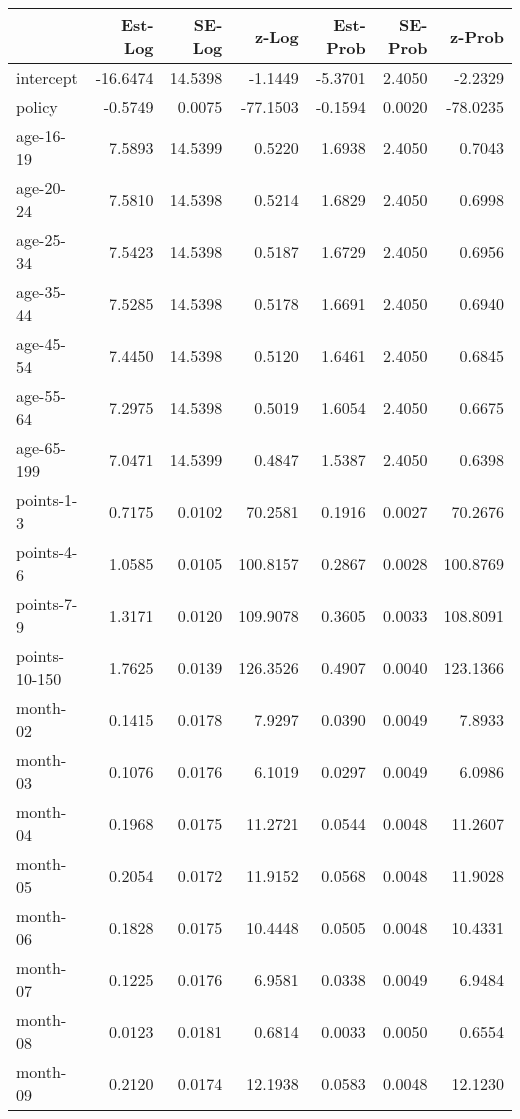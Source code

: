 \documentclass[10pt]{article}
\begin{document}
\begin{table}[ht]
\centering
\begin{tabular}{lrrrrrr}
  \hline
 & Est-Log & SE-Log & z-Log & Est-Prob & SE-Prob & z-Prob \\ 
  \hline
intercept & -16.6474 & 14.5398 & -1.1449 & -5.3701 & 2.4050 & -2.2329 \\ 
  policy & -0.5749 & 0.0075 & -77.1503 & -0.1594 & 0.0020 & -78.0235 \\ 
  age-16-19 & 7.5893 & 14.5399 & 0.5220 & 1.6938 & 2.4050 & 0.7043 \\ 
  age-20-24 & 7.5810 & 14.5398 & 0.5214 & 1.6829 & 2.4050 & 0.6998 \\ 
  age-25-34 & 7.5423 & 14.5398 & 0.5187 & 1.6729 & 2.4050 & 0.6956 \\ 
  age-35-44 & 7.5285 & 14.5398 & 0.5178 & 1.6691 & 2.4050 & 0.6940 \\ 
  age-45-54 & 7.4450 & 14.5398 & 0.5120 & 1.6461 & 2.4050 & 0.6845 \\ 
  age-55-64 & 7.2975 & 14.5398 & 0.5019 & 1.6054 & 2.4050 & 0.6675 \\ 
  age-65-199 & 7.0471 & 14.5399 & 0.4847 & 1.5387 & 2.4050 & 0.6398 \\ 
  points-1-3 & 0.7175 & 0.0102 & 70.2581 & 0.1916 & 0.0027 & 70.2676 \\ 
  points-4-6 & 1.0585 & 0.0105 & 100.8157 & 0.2867 & 0.0028 & 100.8769 \\ 
  points-7-9 & 1.3171 & 0.0120 & 109.9078 & 0.3605 & 0.0033 & 108.8091 \\ 
  points-10-150 & 1.7625 & 0.0139 & 126.3526 & 0.4907 & 0.0040 & 123.1366 \\ 
  month-02 & 0.1415 & 0.0178 & 7.9297 & 0.0390 & 0.0049 & 7.8933 \\ 
  month-03 & 0.1076 & 0.0176 & 6.1019 & 0.0297 & 0.0049 & 6.0986 \\ 
  month-04 & 0.1968 & 0.0175 & 11.2721 & 0.0544 & 0.0048 & 11.2607 \\ 
  month-05 & 0.2054 & 0.0172 & 11.9152 & 0.0568 & 0.0048 & 11.9028 \\ 
  month-06 & 0.1828 & 0.0175 & 10.4448 & 0.0505 & 0.0048 & 10.4331 \\ 
  month-07 & 0.1225 & 0.0176 & 6.9581 & 0.0338 & 0.0049 & 6.9484 \\ 
  month-08 & 0.0123 & 0.0181 & 0.6814 & 0.0033 & 0.0050 & 0.6554 \\ 
  month-09 & 0.2120 & 0.0174 & 12.1938 & 0.0583 & 0.0048 & 12.1230 \\ 

\end{tabular}
\end{table}
\end{document}
